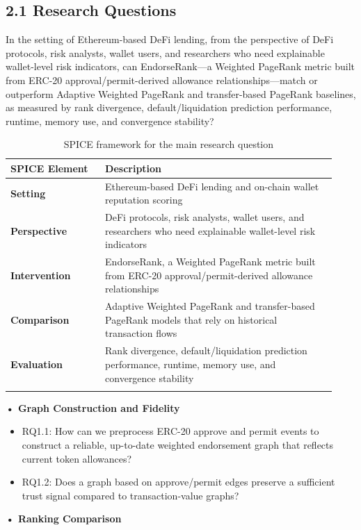 \documentclass[12pt]{article}
\newcommand{\proposalSubheading}[1]{%
  \par\addvspace{0.38\baselineskip}%
  \noindent\textbf{#1}\par\nobreak\addvspace{0.08\baselineskip}%
}
\begin{document}
\subsection*{2.1 Research Questions}
\label{sec:research-questions}

In the setting of Ethereum-based DeFi lending, from the perspective of DeFi protocols, risk analysts, wallet users, and researchers who need explainable wallet-level risk indicators, can EndorseRank---a Weighted PageRank metric built from ERC-20 approval/permit-derived allowance relationships---match or outperform Adaptive Weighted PageRank and transfer-based PageRank baselines, as measured by rank divergence, default/liquidation prediction performance, runtime, memory use, and convergence stability?


\begin{longtable}{>{\raggedright\arraybackslash}p{0.27\linewidth}>{\raggedright\arraybackslash}p{0.66\linewidth}}
\caption{SPICE framework for the main research question}\\
\toprule
\textbf{SPICE Element} & Description \\
\midrule
\textbf{Setting} & Ethereum-based DeFi lending and on-chain wallet reputation scoring \\
\addlinespace
\textbf{Perspective} & DeFi protocols, risk analysts, wallet users, and researchers who need explainable wallet-level risk indicators \\
\addlinespace
\textbf{Intervention} & EndorseRank, a Weighted PageRank metric built from ERC-20 approval/permit-derived allowance relationships \\
\addlinespace
\textbf{Comparison} & Adaptive Weighted PageRank and transfer-based PageRank models that rely on historical transaction flows \\
\addlinespace
\textbf{Evaluation} & Rank divergence, default/liquidation prediction performance, runtime, memory use, and convergence stability \\
\addlinespace
\bottomrule
\end{longtable}

\proposalSubheading{• Graph Construction and Fidelity}

\begin{itemize}
\item[\textendash] RQ1.1: How can we preprocess ERC-20 approve and permit events to construct a reliable, up-to-date weighted endorsement graph that reflects current token allowances?
\item[\textendash] RQ1.2: Does a graph based on approve/permit edges preserve a sufficient trust signal compared to transaction-value graphs?
\end{itemize}
\proposalSubheading{• Ranking Comparison}
\end{document}
